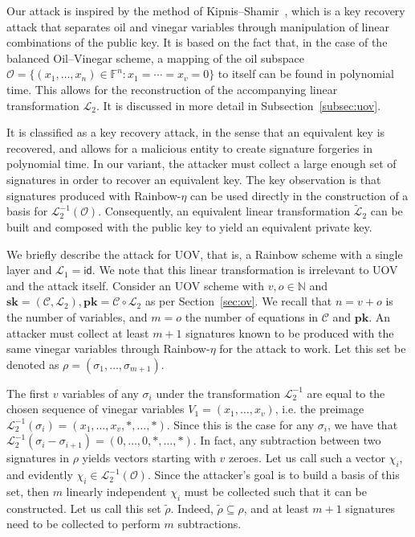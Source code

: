 \documentclass[draft, 12pt, a4paper, oneside]{memoir}
\theoremstyle{definition}
\begin{document}
Our attack is inspired by the method of Kipnis--Shamir~\cite{Kipnis:199808}, which is a key recovery attack that separates oil and vinegar variables through manipulation of linear combinations of the public key. It is based on the fact that, in the case of the balanced Oil--Vinegar scheme, a mapping of the oil subspace $\mathcal{O} = \{ (x_{1}, \dots, x_{n}) \in \mathbb{F}^{n} : x_{1} = \cdots = x_{v} = 0 \}$ to itself can be found in polynomial time. This allows for the reconstruction of the accompanying linear transformation $\mathcal{L}_{2}$. It is discussed in more detail in Subsection~\ref{subsec:uov}.

It is classified as a key recovery attack, in the sense that an equivalent key is recovered, and allows for a malicious entity to create signature forgeries in polynomial time. In our variant, the attacker must collect a large enough set of signatures in order to recover an equivalent key. The key observation is that signatures produced with Rainbow-$\eta$ can be used directly in the construction of a basis for $\mathcal{L}_{2}^{-1}(\mathcal{O})$. Consequently, an equivalent linear transformation $\widetilde{\mathcal{L}}_{2}$ can be built and composed with the public key to yield an equivalent private key.

We briefly describe the attack for UOV, that is, a Rainbow scheme with a single layer and $\mathcal{L}_{1} = \textsf{id}$. We note that this linear transformation is irrelevant to UOV and the attack itself. Consider an UOV scheme with $v, o \in \mathbb{N}$ and $\mathbf{sk} = (\mathcal{C}, \mathcal{L}_{2}), \mathbf{pk} = \mathcal{C} \circ \mathcal{L}_{2}$ as per Section~\ref{sec:ov}. We recall that $n = v + o$ is the number of variables, and $m = o$ the number of equations in $\mathcal{C}$ and $\mathbf{pk}$. An attacker must collect at least $m + 1$ signatures known to be produced with the same vinegar variables through Rainbow-$\eta$ for the attack to work. Let this set be denoted as $\rho = (\sigma_{1}, \dots, \sigma_{m + 1})$. 

The first $v$ variables of any $\sigma_{i}$ under the transformation $\mathcal{L}_{2}^{-1}$ are equal to the chosen sequence of vinegar variables $V_{1} = (x_{1}, \dots, x_{v})$, i.e. the preimage $\mathcal{L}_{2}^{-1}(\sigma_{i}) = (x_{1}, \dots, x_{v}, \ast, \dots, \ast)$. Since this is the case for any $\sigma_{i}$, we have that $\mathcal{L}_{2}^{-1}(\sigma_{i} - \sigma_{i + 1}) = (0, \dots, 0, \ast, \dots, \ast)$. In fact, any subtraction between two signatures in $\rho$ yields vectors starting with $v$ zeroes. Let us call such a vector $\chi_{i}$, and evidently $\chi_{i} \in \mathcal{L}_{2}^{-1}(\mathcal{O})$. Since the attacker's goal is to build a basis of this set, then $m$ linearly independent $\chi_{i}$ must be collected such that it can be constructed. Let us call this set $\widetilde{\rho}$. Indeed, $\widetilde{\rho} \subseteq \rho$, and at least $m + 1$ signatures need to be collected to perform $m$ subtractions.
\end{document}

